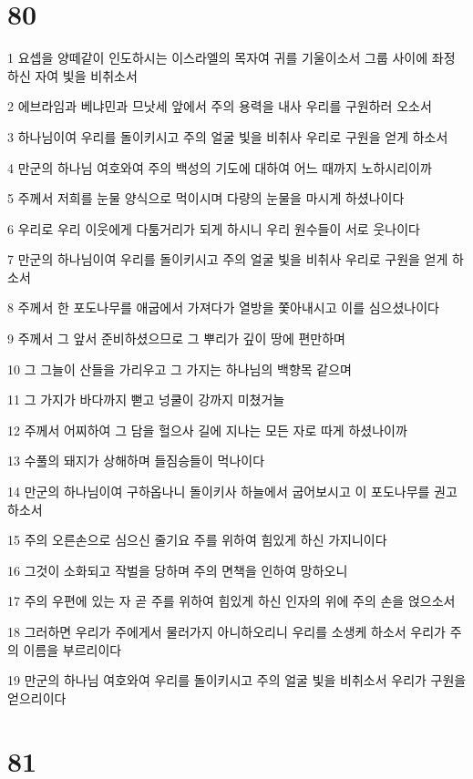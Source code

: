\chapter{80}

\par 1 요셉을 양떼같이 인도하시는 이스라엘의 목자여 귀를 기울이소서 그룹 사이에 좌정하신 자여 빛을 비취소서
\par 2 에브라임과 베냐민과 므낫세 앞에서 주의 용력을 내사 우리를 구원하러 오소서
\par 3 하나님이여 우리를 돌이키시고 주의 얼굴 빛을 비취사 우리로 구원을 얻게 하소서
\par 4 만군의 하나님 여호와여 주의 백성의 기도에 대하여 어느 때까지 노하시리이까
\par 5 주께서 저희를 눈물 양식으로 먹이시며 다량의 눈물을 마시게 하셨나이다
\par 6 우리로 우리 이웃에게 다툼거리가 되게 하시니 우리 원수들이 서로 웃나이다
\par 7 만군의 하나님이여 우리를 돌이키시고 주의 얼굴 빛을 비취사 우리로 구원을 얻게 하소서
\par 8 주께서 한 포도나무를 애굽에서 가져다가 열방을 쫓아내시고 이를 심으셨나이다
\par 9 주께서 그 앞서 준비하셨으므로 그 뿌리가 깊이 땅에 편만하며
\par 10 그 그늘이 산들을 가리우고 그 가지는 하나님의 백향목 같으며
\par 11 그 가지가 바다까지 뻗고 넝쿨이 강까지 미쳤거늘
\par 12 주께서 어찌하여 그 담을 헐으사 길에 지나는 모든 자로 따게 하셨나이까
\par 13 수풀의 돼지가 상해하며 들짐승들이 먹나이다
\par 14 만군의 하나님이여 구하옵나니 돌이키사 하늘에서 굽어보시고 이 포도나무를 권고하소서
\par 15 주의 오른손으로 심으신 줄기요 주를 위하여 힘있게 하신 가지니이다
\par 16 그것이 소화되고 작벌을 당하며 주의 면책을 인하여 망하오니
\par 17 주의 우편에 있는 자 곧 주를 위하여 힘있게 하신 인자의 위에 주의 손을 얹으소서
\par 18 그러하면 우리가 주에게서 물러가지 아니하오리니 우리를 소생케 하소서 우리가 주의 이름을 부르리이다
\par 19 만군의 하나님 여호와여 우리를 돌이키시고 주의 얼굴 빛을 비취소서 우리가 구원을 얻으리이다

\chapter{81}

